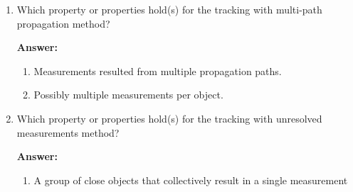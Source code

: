 \begin{enumerate}
\item Which property or properties hold(s) for the tracking with multi-path propagation method?

\textbf{Answer:}

\begin{enumerate}
\item Measurements resulted from multiple propagation paths.
\item Possibly multiple measurements per object.
\end{enumerate}

\item Which property or properties hold(s) for the tracking with unresolved measurements method?

\textbf{Answer:}

\begin{enumerate}
\item A group of close objects that collectively result in a single measurement
\end{enumerate}
\end{enumerate}

